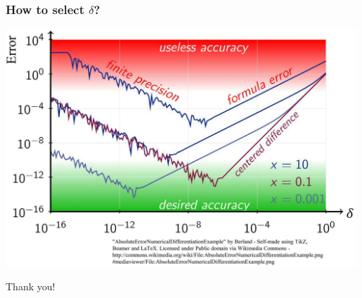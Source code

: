 \documentclass[12pt,notes,mathserif]{beamer}
\newcommand{\chuhao}{\fontsize{44.9pt}{\baselineskip}\selectfont}
\begin{document}
\begin{frame}[c]
	\frametitle{How to select $\delta$?}
	\begin{center}
		\includegraphics[width=0.99\textwidth]{fig/lec617.jpg}
	\end{center}
\end{frame}









\begin{frame}
	\begin{center}
		\chuhao Thank you! %
	\end{center}
\end{frame}
\end{document}
